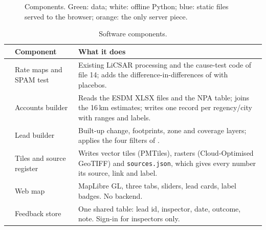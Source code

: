 \begin{figure}[H]
\centering
{}
\caption{Components. Green: data; white: offline Python; blue: static files served to the browser;
orange: the only server piece.}
\end{figure}

{\small
\begin{xltabular}{\linewidth}{@{}L{8mm}L{36mm}Y@{}}
\caption{Software components.}\label{tab:sw}\\*
\toprule
 & \textbf{Component} & \textbf{What it does}\\*
\midrule
{} & Rate maps and SPAM test & Existing LiCSAR processing and the cause-test code of file 14; adds the difference-in-differences of  with placebos.\\
 & Accounts builder & Reads the ESDM XLSX files and the NPA table; joins the 16\,km estimates; writes one record per regency/city with ranges and labels.\\
 & Lead builder & Built-up change, footprints, zone and coverage layers; applies the four filters of .\\
 & Tiles and source register & Writes vector tiles (PMTiles), rasters (Cloud-Optimised GeoTIFF) and \texttt{sources.json}, which gives every number its source, link and label.\\
 & Web map & MapLibre GL, three tabs, sliders, lead cards, label badges. No backend.\\
 & Feedback store & One shared table: lead id, inspector, date, outcome, note. Sign-in for inspectors only.\\
\bottomrule
\end{xltabular}}

